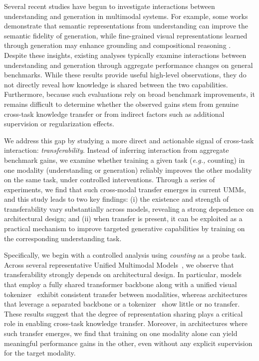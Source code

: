 Several recent studies have begun to investigate interactions between understanding and generation in multimodal systems. For example, some works demonstrate that semantic representations from understanding can improve the semantic fidelity of generation, while fine-grained visual representations learned through generation may enhance grounding and compositional reasoning \cite{wu2026liquid,xin2025lumina,yang2025mmar,wu2025harmonizing,kou2025orthus,li2025dual,zhang2025unified}.  Despite these insights, existing analyses typically examine interactions between understanding and generation through aggregate performance changes on general benchmarks. While these results provide useful high-level observations, they do not directly reveal how knowledge is shared between the two capabilities. Furthermore, because such evaluations rely on broad benchmark improvements, it remains difficult to determine whether the observed gains stem from genuine cross-task knowledge transfer or from indirect factors such as additional supervision or regularization effects. 

We address this gap by studying a more direct and actionable signal of cross-task interaction: \emph{transferability}.
Instead of inferring interaction from aggregate benchmark gains, we examine whether training a given task (\textit{e.g.,} counting) in one modality (understanding or generation) reliably improves the other modality on the same task, under controlled interventions. Through a series of experiments, we find that such cross-modal transfer emerges in current UMMs, and this study leads to two key findings: (i) the existence and strength of transferability vary substantially across models, revealing a strong dependence on architectural design; and  (ii) when transfer is present, it can be exploited as a practical mechanism to improve targeted generative capabilities by training on the corresponding understanding task.

Specifically, we begin with a controlled analysis using \textit{counting} as a probe task. Across several representative Unified Multimodal Models~\cite{xin2025lumina,chen2025januspro,chen2505blip3,deng2025bagel}, we observe that transferability strongly depends on architectural design. In particular, models that employ a fully shared transformer backbone along with a unified visual tokenizer~\cite{xin2025lumina} exhibit consistent transfer between modalities, whereas architectures that leverage a separated backbone or a tokenizer~\cite{chen2025januspro, chen2505blip3} show little or no transfer. These results suggest that the degree of representation sharing plays a critical role in enabling cross-task knowledge transfer. Moreover, in architectures where such transfer emerges, we find that training on one modality alone can yield meaningful performance gains in the other, even without any explicit supervision for the target modality.

